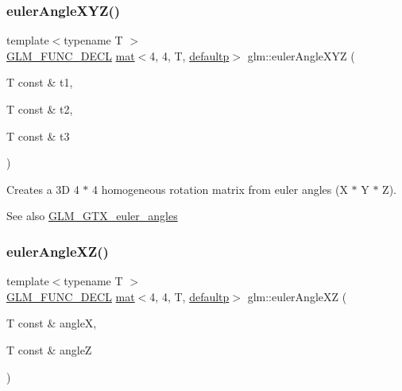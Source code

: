 \subsubsection{\texorpdfstring{euler\+Angle\+X\+Y\+Z()}{eulerAngleXYZ()}}
{\footnotesize\ttfamily template$<$typename T $>$ \\
\mbox{\hyperlink{setup_8hpp_ab2d052de21a70539923e9bcbf6e83a51}{G\+L\+M\+\_\+\+F\+U\+N\+C\+\_\+\+D\+E\+CL}} \mbox{\hyperlink{structglm_1_1mat}{mat}}$<$4, 4, T, \mbox{\hyperlink{namespaceglm_a36ed105b07c7746804d7fdc7cc90ff25a9d21ccd8b5a009ec7eb7677befc3bf51}{defaultp}}$>$ glm\+::euler\+Angle\+X\+YZ (\begin{DoxyParamCaption}\item[{T const \&}]{t1,  }\item[{T const \&}]{t2,  }\item[{T const \&}]{t3 }\end{DoxyParamCaption})}

Creates a 3D 4 $\ast$ 4 homogeneous rotation matrix from euler angles (X $\ast$ Y $\ast$ Z). \begin{DoxySeeAlso}{See also}
\mbox{\hyperlink{group__gtx__euler__angles}{G\+L\+M\+\_\+\+G\+T\+X\+\_\+euler\+\_\+angles}} 
\end{DoxySeeAlso}
\mbox{\label{group__gtx__euler__angles_gaa39bd323c65c2fc0a1508be33a237ce9}} 
\subsubsection{\texorpdfstring{euler\+Angle\+X\+Z()}{eulerAngleXZ()}}
{\footnotesize\ttfamily template$<$typename T $>$ \\
\mbox{\hyperlink{setup_8hpp_ab2d052de21a70539923e9bcbf6e83a51}{G\+L\+M\+\_\+\+F\+U\+N\+C\+\_\+\+D\+E\+CL}} \mbox{\hyperlink{structglm_1_1mat}{mat}}$<$4, 4, T, \mbox{\hyperlink{namespaceglm_a36ed105b07c7746804d7fdc7cc90ff25a9d21ccd8b5a009ec7eb7677befc3bf51}{defaultp}}$>$ glm\+::euler\+Angle\+XZ (\begin{DoxyParamCaption}\item[{T const \&}]{angleX,  }\item[{T const \&}]{angleZ }\end{DoxyParamCaption})}

